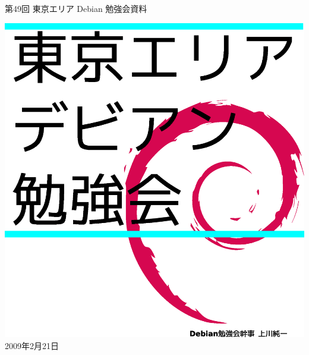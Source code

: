 \documentclass[mingoth,a4paper]{jsarticle}
\newcommand{\debmtgyear}{2009}
\newcommand{\debmtgmonth}{2}
\newcommand{\debmtgdate}{21}
\newcommand{\debmtgnumber}{49}
\begin{document}
\begin{titlepage}
\thispagestyle{empty}


\vspace*{-2cm}
第\debmtgnumber{}回 東京エリア Debian 勉強会資料

\hspace*{-2.4cm}
\includegraphics[width=210mm]{image200801/2008title.eps}\\
\hfill{}\debmtgyear{}年\debmtgmonth{}月\debmtgdate{}日

\end{titlepage}

\end{document}

